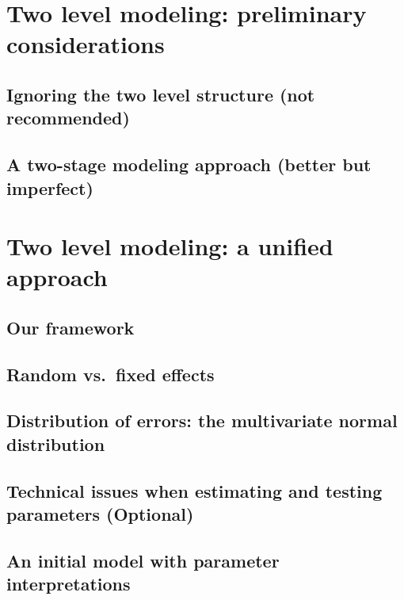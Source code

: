 \documentclass[
]{krantz}
\begin{document}
\hypertarget{twolevelmodeling}{%
\section{Two level modeling: preliminary considerations}\label{twolevelmodeling}}

\hypertarget{multregr}{%
\subsection{Ignoring the two level structure (not recommended)}\label{multregr}}

\hypertarget{twostage}{%
\subsection{A two-stage modeling approach (better but imperfect)}\label{twostage}}

\hypertarget{twolevelmodelingunified}{%
\section{Two level modeling: a unified approach}\label{twolevelmodelingunified}}

\hypertarget{ourframework}{%
\subsection{Our framework}\label{ourframework}}

\hypertarget{random-vs.-fixed-effects}{%
\subsection{Random vs.~fixed effects}\label{random-vs.-fixed-effects}}

\hypertarget{MVN}{%
\subsection{Distribution of errors: the multivariate normal distribution}\label{MVN}}

\hypertarget{multileveltechnical}{%
\subsection{Technical issues when estimating and testing parameters (Optional)}\label{multileveltechnical}}

\hypertarget{initialmodel}{%
\subsection{An initial model with parameter interpretations}\label{initialmodel}}
\end{document}
